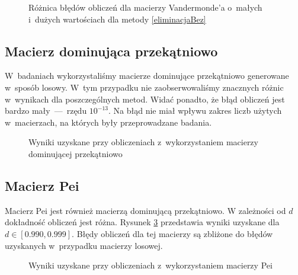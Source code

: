 \documentclass[a4paper]{article}
\begin{document}
\begin{figure}[H]
\centering
\caption{Różnica błędów obliczeń dla macierzy Vandermonde'a o~małych i~dużych wartościach dla metody \ref{eliminacjaBez}}
\label{fig:porownanie eliminacjaBez vandermond}
\end{figure}

\subsection{Macierz dominująca przekątniowo}\label{sec:dominate}

W~badaniach wykorzystaliśmy macierze dominujące przekątniowo generowane w~sposób losowy. W~tym przypadku nie zaobserwowaliśmy znacznych różnic w~wynikach dla poszczególnych metod.
Widać ponadto, że błąd obliczeń jest bardzo mały~---~rzędu $10^{-13}$. Na błąd nie miał wpływu zakres liczb użytych w~macierzach, na których były przeprowadzane badania.

\begin{figure}[H]
 \centering
\caption{Wyniki uzyskane przy obliczeniach z~wykorzystaniem macierzy dominującej przekątniowo}
\label{fig:dominate}
\end{figure}

\subsection{Macierz Pei}\label{sec:pea}
Macierz Pei jest również macierzą dominującą przekątniowo. W zależności od $d$ dokładność obliczeń jest różna. Rysunek \ref{fig:pea} przedstawia wyniki uzyskane dla $d \in [0.990, 0.999]$.
Błędy obliczeń dla tej macierzy są zbliżone do błędów uzyskanych w~przypadku macierzy losowej.

\begin{figure}[H]
\centering
\caption{Wyniki uzyskane przy obliczeniach z~wykorzystaniem macierzy Pei}
\label{fig:pea}
\end{figure}
\end{document}
